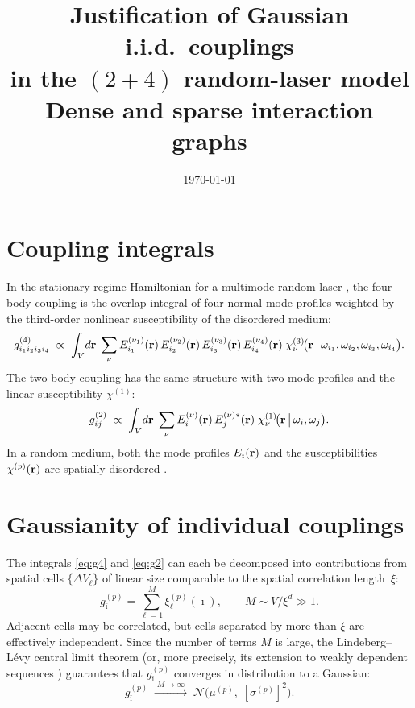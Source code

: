 \documentclass[11pt,a4paper]{article}
\title{Justification of Gaussian i.i.d.\ couplings\\[4pt]
       in the $(2{+}4)$ random-laser model\\[2pt]
       \large Dense and sparse interaction graphs}
\author{}
\date{\today}
\begin{document}
\maketitle

\section{Coupling integrals}

In the stationary-regime Hamiltonian for a multimode random laser
\cite{Antenucci2015a,Gradenigo2020}, the four-body coupling is the
overlap integral of four normal-mode profiles weighted by the
third-order nonlinear susceptibility of the disordered medium:
\begin{equation}\label{eq:g4}
  g^{(4)}_{i_1 i_2 i_3 i_4}
  \;\propto\;
  \int_V \!d\vb{r}\;
  \sum_{\nu}
    E^{(\nu_1)}_{i_1}(\vb{r})\,
    E^{(\nu_2)}_{i_2}(\vb{r})\,
    E^{(\nu_3)}_{i_3}(\vb{r})\,
    E^{(\nu_4)}_{i_4}(\vb{r})\;
    \chi^{(3)}_{\nu}\!\bigl(\vb{r}\,\big|\,
      \omega_{i_1},\omega_{i_2},\omega_{i_3},\omega_{i_4}\bigr).
\end{equation}
The two-body coupling has the same structure with two mode profiles
and the linear susceptibility $\chi^{(1)}$:
\begin{equation}\label{eq:g2}
  g^{(2)}_{ij}
  \;\propto\;
  \int_V \!d\vb{r}\;
  \sum_\nu
    E^{(\nu)}_i(\vb{r})\,
    E^{(\nu)*}_j(\vb{r})\;
    \chi^{(1)}_\nu\!\bigl(\vb{r}\,\big|\,\omega_i,\omega_j\bigr).
\end{equation}
In a random medium, both the mode profiles $E_i(\vb{r})$ and the
susceptibilities $\chi^{(p)}(\vb{r})$ are spatially disordered
\cite{Fallert2009,Conti2008}.

\section{Gaussianity of individual couplings}

The integrals \eqref{eq:g4} and \eqref{eq:g2} can each be decomposed
into contributions from spatial cells $\{\Delta V_\ell\}$ of
linear size comparable to the spatial correlation length~$\xi$:
\begin{equation}\label{eq:cell_sum}
  g^{(p)}_{\bar\imath}
  = \sum_{\ell=1}^{M} \xi^{(p)}_\ell(\bar\imath),
  \qquad
  M \sim V/\xi^d \gg 1.
\end{equation}
Adjacent cells may be correlated, but cells separated by more than
$\xi$ are effectively independent.  Since the number of terms $M$ is
large, the Lindeberg--L\'evy central limit theorem (or, more
precisely, its extension to weakly dependent sequences
\cite{Billingsley1995}) guarantees that $g^{(p)}_{\bar\imath}$
converges in distribution to a Gaussian:
\begin{equation}
  g^{(p)}_{\bar\imath}
  \;\xrightarrow{\;M\to\infty\;}\;
  \mathcal{N}\!\bigl(\mu^{(p)},\;[\sigma^{(p)}]^2\bigr).
\end{equation}
\end{document}
